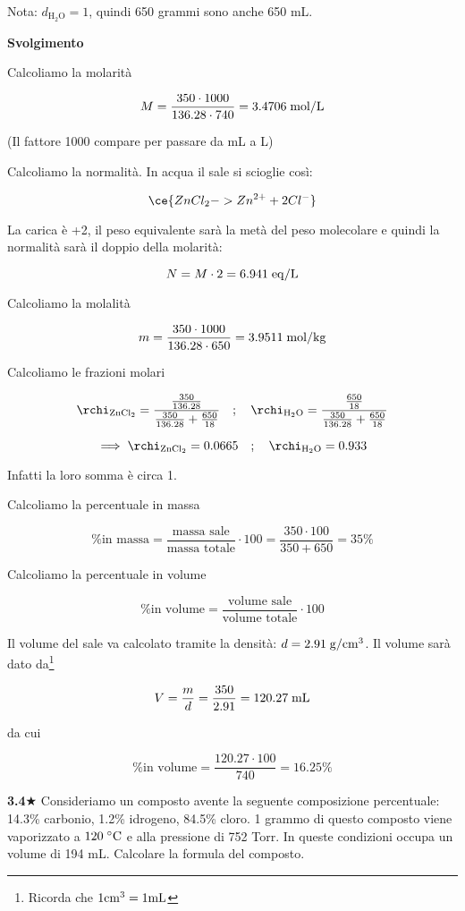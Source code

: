 \vspace{0.2cm}Nota: $d_{\text{H}_2\text{O}}=1$, quindi 650 grammi sono anche 650 mL.

\vspace{0.2cm}\large\textbf{Svolgimento}\normalsize

\vspace{0.2cm}Calcoliamo la molarità

$$M=\frac{350 \cdot 1000}{136.28 \cdot 740}=3.4706 \; \rm mol/L$$

(Il fattore 1000 compare per passare da mL a L)

Calcoliamo la normalità. In acqua il sale si scioglie così:

$$\ce{ZnCl_2 -> Zn^{2+} + 2Cl^-}$$

La carica è +2, il peso equivalente sarà la metà del peso molecolare e quindi la normalità sarà il doppio della molarità:

$$N=M \cdot 2=6.941 \; \rm eq/L$$

Calcoliamo la molalità

$$m=\frac{350 \cdot 1000}{136.28 \cdot 650}=3.9511 \; \rm mol/kg$$

Calcoliamo le frazioni molari

$$\rchi_{\rm ZnCl_2}=\frac{\frac{350}{136.28}}{\frac{350}{136.28} + \frac{650}{18}}
\quad;\quad
\rchi_{\rm H_2O}=\frac{\frac{650}{18}}{\frac{350}{136.28} + \frac{650}{18}}$$

$$\implies
\rchi_{\rm ZnCl_2}=0.0665
\quad;\quad
\rchi_{\rm H_2O}=0.933
$$

Infatti la loro somma è circa 1.

Calcoliamo la percentuale in massa

$$\text{\% in massa}
=\frac{\text{massa sale}}{\text{massa totale}} \cdot 100
=\frac{350 \cdot 100}{350 + 650}=35\%$$

Calcoliamo la percentuale in volume

$$\text{\% in volume}
=\frac{\text{volume sale}}{\text{volume totale}} \cdot 100$$

Il volume del sale va calcolato tramite la densità: $d=2.91 \; \rm g/cm^3$. Il volume sarà dato da\footnote{Ricorda che $\rm 1 cm^3 = 1 mL$}

$$V=\frac{m}{d}=\frac{350}{2.91}=120.27 \; \rm mL$$

da cui 

$$\text{\% in volume}
=\frac{120.27 \cdot 100}{740}=16.25\%$$

\vspace{0.2cm}\textbf{3.4}$\bigstar$ Consideriamo un composto avente la seguente composizione percentuale: 14.3\% carbonio, 1.2\% idrogeno, 84.5\% cloro. 1 grammo di questo composto viene vaporizzato a $120 \; \rm ^{\circ}C$ e alla pressione di 752 Torr. In queste condizioni occupa un volume di 194 mL. Calcolare la formula del composto.

